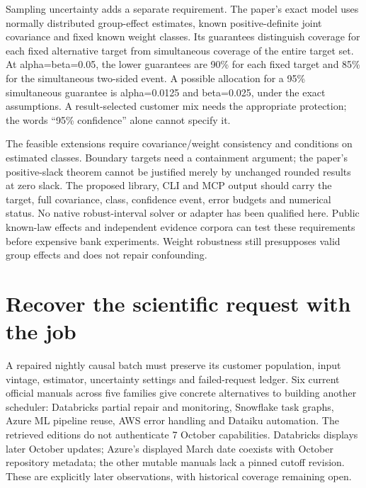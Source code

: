Sampling uncertainty adds a separate requirement. The paper's exact
model uses normally distributed group-effect estimates, known
positive-definite joint covariance and fixed known weight classes. Its
guarantees distinguish coverage for each fixed alternative target from
simultaneous coverage of the entire target set. At alpha=beta=0.05, the
lower guarantees are 90\% for each fixed target and 85\% for the
simultaneous two-sided event. A possible allocation for a 95\%
simultaneous guarantee is alpha=0.0125 and beta=0.025, under the exact
assumptions. A result-selected customer mix needs the appropriate
protection; the words ``95\% confidence'' alone cannot specify it.
\citep{exec22_weighted_vilfort,exec22_weighted_reference}

The feasible extensions require covariance/weight consistency and
conditions on estimated classes. Boundary targets need a containment
argument; the paper's positive-slack theorem cannot be justified merely
by unchanged rounded results at zero slack. The proposed library, CLI
and MCP output should carry the target, full covariance, class,
confidence event, error budgets and numerical status. No native
robust-interval solver or adapter has been qualified here. Public
known-law effects and independent evidence corpora can test these
requirements before expensive bank experiments. Weight robustness still
presupposes valid group effects and does not repair confounding.
\citep{exec22_weighted_vilfort}

\hypertarget{recover-the-scientific-request-with-the-job}{%
\section{Recover the scientific request with the
job}\label{recover-the-scientific-request-with-the-job}}

A repaired nightly causal batch must preserve its customer population,
input vintage, estimator, uncertainty settings and failed-request
ledger. Six current official manuals across five families give concrete
alternatives to building another scheduler: Databricks partial repair
and monitoring, Snowflake task graphs, Azure ML pipeline reuse, AWS
error handling and Dataiku automation. The retrieved editions do not
authenticate 7 October capabilities. Databricks displays later October
updates; Azure's displayed March date coexists with October repository
metadata; the other mutable manuals lack a pinned cutoff revision. These
are explicitly later observations, with historical coverage remaining
open.\citep{exec22_workflow_databricks_repair,exec22_workflow_databricks_monitor,exec22_workflow_snowflake_graphs,exec22_workflow_azure_reuse,exec22_workflow_aws_errors,exec22_workflow_dataiku_scenarios}

